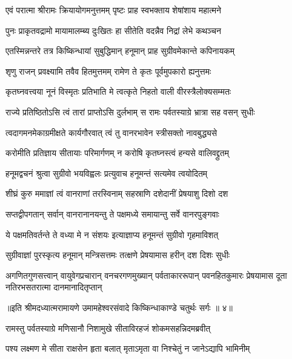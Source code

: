 \twolineshloka
{एवं परात्मा श्रीरामः क्रियायोगमनुत्तमम्}
{पृष्टः प्राह स्वभक्ताय शेषांशाय महात्मने} %

\twolineshloka
{पुनः प्राकृतवद्रामो मायामालम्ब्य दुःखितः}
{हा सीतेति वदन्नैव निद्रां लेभे कथञ्चन} %

\twolineshloka
{एतस्मिन्नन्तरे तत्र किष्किन्धायां सुबुद्धिमान्}
{हनूमान् प्राह सुग्रीवमेकान्ते कपिनायकम्} %

\twolineshloka
{शृणु राजन् प्रवक्ष्यामि तवैव हितमुत्तमम्}
{रामेण ते कृतः पूर्वमुपकारो ह्यनुत्तमः} %

\twolineshloka
{कृतघ्नवत्त्वया नूनं विस्मृतः प्रतिभाति मे}
{त्वत्कृते निहतो वाली वीरस्त्रैलोक्यसम्मतः} %

\twolineshloka
{राज्ये प्रतिष्ठितोऽसि त्वं तारां प्राप्तोऽसि दुर्लभाम्}
{स रामः पर्वतस्याग्रे भ्रात्रा सह वसन् सुधीः} %

\twolineshloka
{त्वदागमनमेकाग्रमीक्षते कार्यगौरवात्}
{त्वं तु वानरभावेन स्त्रीसक्तो नावबुद्ध्यसे} %

\twolineshloka
{करोमीति प्रतिज्ञाय सीतायाः परिमार्गणम्}
{न करोषि कृतघ्नस्त्वं हन्यसे वालिवद्द्रुतम्} %

\twolineshloka
{हनूमद्वचनं श्रुत्वा सुग्रीवो भयविह्वलः}
{प्रत्युवाच हनूमन्तं सत्यमेव त्वयोदितम्} %

\twolineshloka
{शीघ्रं कुरु ममाज्ञां त्वं वानराणां तरस्विनाम्}
{सहस्राणि दशेदानीं प्रेषयाशु दिशो दश} %

\twolineshloka
{सप्तद्वीपगतान् सर्वान् वानरानानयन्तु ते}
{पक्षमध्ये समायान्तु सर्वे वानरपुङ्गवाः} %

\twolineshloka
{ये पक्षमतिवर्तन्ते ते वध्या मे न संशयः}
{इत्याज्ञाप्य हनूमन्तं सुग्रीवो गृहमाविशत्} %

\twolineshloka
{सुग्रीवाज्ञां पुरस्कृत्य हनूमान् मन्त्रिसत्तमः}
{तत्क्षणे प्रेषयामास हरीन् दश दिशः सुधीः} %

\fourlineindentedshloka
{अगणितगुणसत्त्वान् वायुवेगप्रचारान्}
{वनचरगणमुख्यान् पर्वताकाररूपान्}
{पवनहितकुमारः प्रेषयामास दूता\-}
{नतिरभसतरात्मा दानमानादितृप्तान्} %

{॥इति श्रीमदध्यात्मरामायणे उमामहेश्वरसंवादे किष्किन्धाकाण्डे
चतुर्थः सर्गः ॥ ४॥
}




\twolineshloka
{रामस्तु पर्वतस्याग्रे मणिसानौ निशामुखे}
{सीताविरहजं शोकमसहन्निदमब्रवीत्} %

\twolineshloka
{पश्य लक्ष्मण मे सीता राक्षसेन हृता बलात्}
{मृताऽमृता वा निश्चेतुं न जानेऽद्यापि भामिनीम्} %

